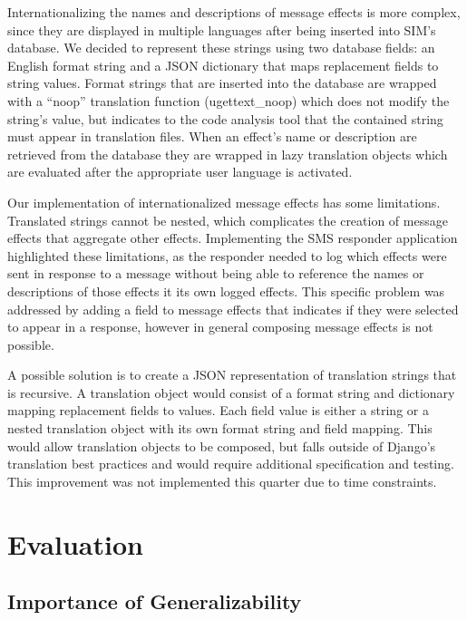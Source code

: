 \documentclass{acm_proc_article-sp}
\begin{document}
Internationalizing the names and descriptions of message effects is more complex, since they are displayed in multiple languages after being inserted into SIM's database. We decided to represent these strings using two database fields: an English format string and a JSON dictionary that maps replacement fields to string values. Format strings that are inserted into the database are wrapped with a “noop” translation function (ugettext\_noop) which does not modify the string's value, but indicates to the code analysis tool that the contained string must appear in translation files. When an effect's name or description are retrieved from the database they are wrapped in lazy translation objects which are evaluated after the appropriate user language is activated.

Our implementation of internationalized message effects has some limitations. Translated strings cannot be nested, which complicates the creation of message effects that aggregate other effects. Implementing the SMS responder application highlighted these limitations, as the responder needed to log which effects were sent in response to a message without being able to reference the names or descriptions of those effects it its own logged effects. This specific problem was addressed by adding a field to message effects that indicates if they were selected to appear in a response, however in general composing message effects is not possible.

A possible solution is to create a JSON representation of translation strings that is recursive. A translation object would consist of a format string and dictionary mapping replacement fields to values. Each field value is either a string or a nested translation object with its own format string and field mapping. This would allow translation objects to be composed, but falls outside of Django's translation best practices and would require additional specification and testing. This improvement was not implemented this quarter due to time constraints.

\section{Evaluation}

\subsection{Importance of Generalizability}
\end{document}
